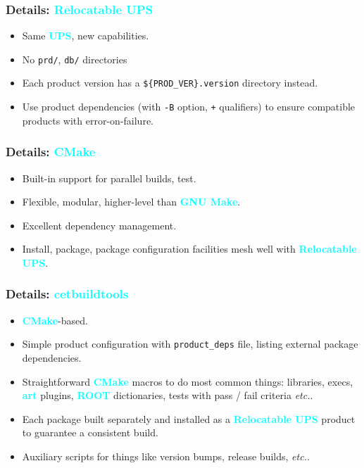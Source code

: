 \documentclass[xcolor={dvipsnames,table},c,compress,colorlinks]{beamer}
\newcommand{\productname}[1]{\textbf{\textcolor{cyan}{#1}}\xspace}
\newcommand{\cmd}[1]{\texttt{#1}\xspace}
\newcommand{\art}{\productname{art}}
\newcommand{\etc}{\textit{etc.}}
\newcommand{\rootprod}{\productname{ROOT}}
\newcommand{\cmake}{\productname{CMake}}
\newcommand{\make}{\productname{GNU Make}}
\newcommand{\ups}{\productname{UPS}}
\newcommand{\rups}{\productname{Relocatable UPS}}
\begin{document}
\begin{frame}\frametitle{Details: \rups}
  \begin{itemize}
  \item Same \ups, new capabilities.
  \item<2-> No \cmd{prd/}, \cmd{db/} directories
  \item<3-> Each product version has a \cmd{\$\{PROD\_VER\}.version}
    directory instead.
  \item<4-> Use product dependencies (with \cmd{-B} option, \cmd{+}
    qualifiers) to ensure compatible products with error-on-failure.
  \end{itemize}
\end{frame}

\begin{frame}\frametitle{Details: \cmake}
  \begin{itemize}
  \item Built-in support for parallel builds, test.
  \item<2-> Flexible, modular, higher-level than \make.
  \item<3-> Excellent dependency management.
  \item<4-> Install, package, package configuration facilities mesh well
    with \rups.
  \end{itemize}
\end{frame}

\begin{frame}\frametitle{Details: \productname{cetbuildtools}}
  \begin{itemize}
  \item \cmake-based.
  \item<2-> Simple product configuration with \cmd{product\_deps} file,
    listing external package dependencies.
  \item<3-> Straightforward \cmake macros to do most common things: libraries,
    execs, \art plugins, \rootprod dictionaries, tests with pass /
    fail criteria \etc.
  \item<4-> Each package built separately and installed as a \rups product
    to guarantee a consistent build.
    \item<5->Auxiliary scripts for things like version bumps, release
      builds, \etc.
  \end{itemize}
\end{frame}
\end{document}
